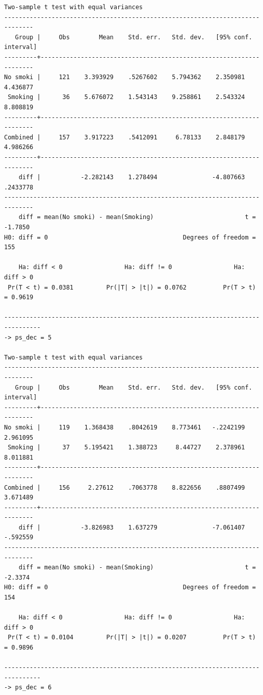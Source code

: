 \documentclass[
  10pt,
]{book}
\begin{document}
\begin{verbatim}
Two-sample t test with equal variances
------------------------------------------------------------------------------
   Group |     Obs        Mean    Std. err.   Std. dev.   [95% conf. interval]
---------+--------------------------------------------------------------------
No smoki |     121    3.393929    .5267602    5.794362    2.350981    4.436877
 Smoking |      36    5.676072    1.543143    9.258861    2.543324    8.808819
---------+--------------------------------------------------------------------
Combined |     157    3.917223    .5412091     6.78133    2.848179    4.986266
---------+--------------------------------------------------------------------
    diff |           -2.282143    1.278494               -4.807663    .2433778
------------------------------------------------------------------------------
    diff = mean(No smoki) - mean(Smoking)                         t =  -1.7850
H0: diff = 0                                     Degrees of freedom =      155

    Ha: diff < 0                 Ha: diff != 0                 Ha: diff > 0
 Pr(T < t) = 0.0381         Pr(|T| > |t|) = 0.0762          Pr(T > t) = 0.9619

--------------------------------------------------------------------------------
-> ps_dec = 5

Two-sample t test with equal variances
------------------------------------------------------------------------------
   Group |     Obs        Mean    Std. err.   Std. dev.   [95% conf. interval]
---------+--------------------------------------------------------------------
No smoki |     119    1.368438    .8042619    8.773461   -.2242199    2.961095
 Smoking |      37    5.195421    1.388723     8.44727    2.378961    8.011881
---------+--------------------------------------------------------------------
Combined |     156     2.27612    .7063778    8.822656    .8807499    3.671489
---------+--------------------------------------------------------------------
    diff |           -3.826983    1.637279               -7.061407    -.592559
------------------------------------------------------------------------------
    diff = mean(No smoki) - mean(Smoking)                         t =  -2.3374
H0: diff = 0                                     Degrees of freedom =      154

    Ha: diff < 0                 Ha: diff != 0                 Ha: diff > 0
 Pr(T < t) = 0.0104         Pr(|T| > |t|) = 0.0207          Pr(T > t) = 0.9896

--------------------------------------------------------------------------------
-> ps_dec = 6


\end{verbatim}
\end{document}
